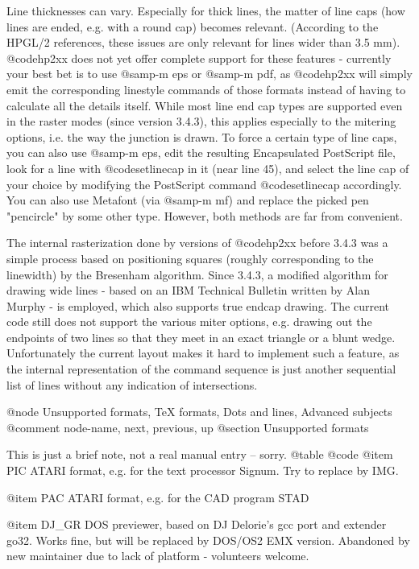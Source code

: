 Line thicknesses can vary. Especially for thick lines, the matter of
line caps (how lines are ended, e.g. with a round cap) becomes relevant.
(According to the HPGL/2 references, these issues are only relevant for
lines wider than 3.5 mm).
@code{hp2xx} does not yet offer complete support for these features -
currently your best bet is to use @samp{-m eps} or @samp{-m pdf}, as
@code{hp2xx} will simply emit the corresponding linestyle commands of
those formats instead of having to calculate all the details itself.
While most line end cap types are supported even in the raster modes
(since version 3.4.3), this applies especially to the mitering options,
i.e. the way the junction is drawn.
To force a certain type of line caps, you can also use @samp{-m eps}, edit 
the resulting Encapsulated PostScript file, look for a line with 
@code{setlinecap} in it (near line 45), and select the line cap of your 
choice by modifying the PostScript command @code{setlinecap}
accordingly. You can also use Metafont (via @samp{-m mf}) and replace
the picked pen "pencircle" by some other type. However, both methods
are far from convenient.

The internal rasterization done by versions of @code{hp2xx} before 3.4.3 
was a simple process based on positioning squares (roughly corresponding
to the linewidth) by the Bresenham algorithm. Since 3.4.3, a modified
algorithm for drawing wide lines - based on an IBM Technical Bulletin
written by Alan Murphy - is employed, which also supports true endcap
drawing. The current code still does not support the various miter options,
e.g. drawing out the endpoints of two lines so that they meet in an exact
triangle or a blunt wedge. Unfortunately the current layout makes it hard
to implement such a feature, as the internal representation of the command
sequence is just another sequential list of lines without any indication
of intersections. 



@node Unsupported formats, TeX formats, Dots and lines, Advanced subjects
@comment  node-name,  next,  previous,  up
@section Unsupported formats

This is just a brief note, not a real manual entry -- sorry.
@table @code
@item PIC
	ATARI format, e.g. for the text processor Signum. Try to replace by IMG.

@item PAC
	ATARI format, e.g. for the CAD program STAD

@item DJ_GR
	DOS previewer, based on DJ Delorie's gcc port and extender go32.
	Works fine, but will be replaced by DOS/OS2 EMX version.
	Abandoned by new maintainer due to lack of platform - volunteers
	welcome.

